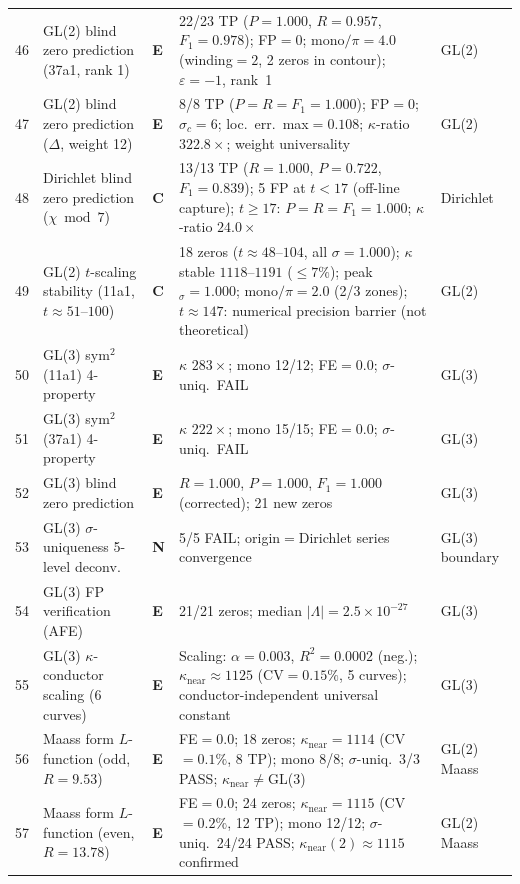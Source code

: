 \documentclass[11pt, a4paper]{article}
\theoremstyle{definition}
\theoremstyle{plain}
\begin{document}
\begin{center}
\begin{longtable}{@{}r l l p{4.2cm} l@{}}
46 & GL(2) blind zero prediction (37a1, rank 1) & \textbf{E} & 22/23 TP ($P{=}1.000$, $R{=}0.957$, $F_1{=}0.978$); FP${=}0$; mono$/\pi{=}4.0$ (winding${=}2$, 2 zeros in contour); $\varepsilon{=}{-1}$, rank~1 & GL(2) \\
47 & GL(2) blind zero prediction ($\Delta$, weight 12) & \textbf{E} & 8/8 TP ($P{=}R{=}F_1{=}1.000$); FP${=}0$; $\sigma_c{=}6$; loc.\ err.\ max${=}0.108$; $\kappa$-ratio $322.8\times$; weight universality & GL(2) \\
48 & Dirichlet blind zero prediction ($\chi\bmod 7$) & \textbf{C} & 13/13 TP ($R{=}1.000$, $P{=}0.722$, $F_1{=}0.839$); 5 FP at $t{<}17$ (off-line capture); $t{\geq}17$: $P{=}R{=}F_1{=}1.000$; $\kappa$-ratio $24.0\times$ & Dirichlet \\
49 & GL(2) $t$-scaling stability (11a1, $t{\approx}51$--$100$) & \textbf{C} & 18 zeros ($t{\approx}48$--$104$, all $\sigma{=}1.000$); $\kappa$ stable $1118$--$1191$ (${\leq}7\%$); peak$_\sigma{=}1.000$; mono$/\pi{=}2.0$ (2/3 zones); $t{\approx}147$: numerical precision barrier (not theoretical) & GL(2) \\
\midrule
50 & GL(3) sym$^2$(11a1) 4-property & \textbf{E} & $\kappa$ $283\times$; mono 12/12; FE${}=0.0$; $\sigma$-uniq.\ FAIL & GL(3) \\
51 & GL(3) sym$^2$(37a1) 4-property & \textbf{E} & $\kappa$ $222\times$; mono 15/15; FE${}=0.0$; $\sigma$-uniq.\ FAIL & GL(3) \\
52 & GL(3) blind zero prediction & \textbf{E} & $R{=}1.000$, $P{=}1.000$, $F_1{=}1.000$ (corrected); 21 new zeros & GL(3) \\
53 & GL(3) $\sigma$-uniqueness 5-level deconv. & \textbf{N} & 5/5 FAIL; origin${}={}$Dirichlet series convergence & GL(3) boundary \\
54 & GL(3) FP verification (AFE) & \textbf{E} & 21/21 zeros; median $|\Lambda|{=}2.5{\times}10^{-27}$ & GL(3) \\
55 & GL(3) $\kappa$-conductor scaling (6 curves) & \textbf{E} & Scaling: $\alpha{=}0.003$, $R^2{=}0.0002$ (neg.); $\kappa_{\mathrm{near}}{\approx}1125$ (CV${=}0.15\%$, 5 curves); conductor-independent universal constant & GL(3) \\
\midrule
56 & Maass form $L$-function (odd, $R{=}9.53$) & \textbf{E} & FE${}=0.0$; 18 zeros; $\kappa_{\mathrm{near}}{=}1114$ (CV${=}0.1\%$, 8 TP); mono 8/8; $\sigma$-uniq.\ 3/3 PASS; $\kappa_{\mathrm{near}}{\neq}$GL(3) & GL(2) Maass \\
57 & Maass form $L$-function (even, $R{=}13.78$) & \textbf{E} & FE${}=0.0$; 24 zeros; $\kappa_{\mathrm{near}}{=}1115$ (CV${=}0.2\%$, 12 TP); mono 12/12; $\sigma$-uniq.\ 24/24 PASS; $\kappa_{\mathrm{near}}(2) \approx 1115$ confirmed & GL(2) Maass \\

\end{longtable}
\end{center}
\end{document}
